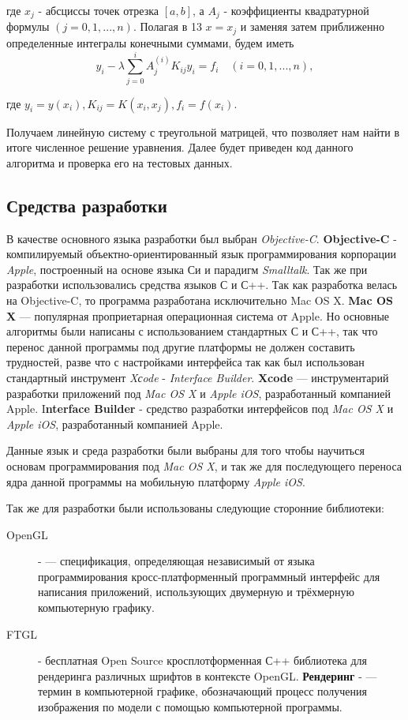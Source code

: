 где $x_j$ - абсциссы точек отрезка $[a, b]$, а $A_j$ - коэффициенты квадратурной формулы $(j = 0, 1, ..., n)$. Полагая в 13 $x = x_j$ и заменяя затем приближенно определенные интегралы конечными суммами, будем иметь
\begin{equation}
y_i - \lambda \sum\limits_{j=0}^i A_j^{(i)} K_{ij} y_i = f_i \quad (i = 0, 1, ..., n),
\end{equation}

где $y_i = y(x_i), K_{ij} = K(x_i, x_j), f_i = f(x_i)$.

Получаем линейную систему с треугольной матрицей, что позволяет нам найти в итоге численное решение уравнения. Далее будет приведен код данного алгоритма и проверка его на тестовых данных.
\begin{center}
\item\subsection{Средства разработки}
\end{center}
В качестве основного языка разработки был выбран \textit{Objective-C}. {\bfseries Objective-C} - компилируемый объектно-ориентированный язык программирования корпорации \textit{Apple}, построенный на основе языка Си и парадигм \textit{Smalltalk}. Так же при разработки использовались средства языков С и С++. Так как разработка велась на Objective-C, то программа разработана исключительно Mac OS X. {\bfseries Mac OS X} — популярная проприетарная операционная система от Apple. Но основные алгоритмы были написаны с использованием стандартных С и С++, так что перенос данной программы под другие платформы не должен составить трудностей, разве что с настройками интерфейса так как был использован стандартный инструмент \textit{Xсode} - \textit{Interface Builder}. {\bfseries Xcode} — инструментарий разработки приложений под \textit{Mac OS X} и \textit{Apple iOS}, разработанный компанией Apple. {I\bfseries nterface Builder} - средство разработки  интерфейсов под \textit{Mac OS X} и \textit{Apple iOS}, разработанный компанией Apple.

Данные язык и среда разработки были выбраны для того чтобы научиться основам программирования под \textit{Mac OS X}, и так же для последующего переноса ядра данной программы на мобильную платформу \textit{Apple iOS}. 

Так же для разработки были использованы следующие сторонние библиотеки:
\begin{description}
\item[OpenGL] -  — спецификация, определяющая независимый от языка программирования кросс-платформенный программный интерфейс для написания приложений, использующих двумерную и трёхмерную компьютерную графику.
\item[FTGL] - бесплатная Open Source кросплотформенная С++ библиотека для рендеринга различных шрифтов в контексте OpenGL. {\bfseries Рендеринг} -  — термин в компьютерной графике, обозначающий процесс получения изображения по модели с помощью компьютерной программы.
\end{description}

